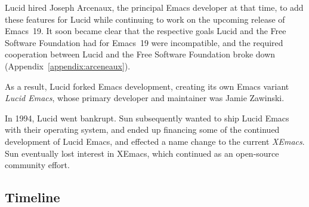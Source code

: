 \documentclass[format=acmsmall,screen]{acmart}
\begin{document}
Lucid hired Joseph Arcenaux,
the principal Emacs developer at that time, to add these features
for Lucid while continuing to work on the upcoming release of Emacs~19.
It soon became clear that the respective goals Lucid and the Free
Software Foundation had for Emacs~19 were incompatible,
and the required cooperation between Lucid and
the Free Software Foundation broke down
(Appendix~\ref{appendix:arceneaux}).

As a result, Lucid forked Emacs development, creating its own Emacs
variant \emph{Lucid Emacs}, whose primary developer and maintainer was
Jamie Zawinski.

In 1994, Lucid went bankrupt.  Sun subsequently wanted to ship
Lucid Emacs with their operating system, and ended up financing some
of the continued development of Lucid Emacs, and effected a name
change to the current \emph{XEmacs}.
Sun eventually lost interest in XEmacs, which continued as an
open-source community effort.

\subsection{Timeline}

\newcommand \EDate [2] {#1}     %
\end{document}
